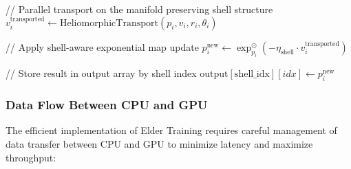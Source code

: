 \begin{algorithm}
\begin{algorithmic}[1]
        \State // Parallel transport on the manifold preserving shell structure
        \State $v_i^{\text{transported}} \gets \text{HeliomorphicTransport}(p_i, v_i, r_i, \theta_i)$
        
        \State // Apply shell-aware exponential map update
        \State $p_i^{\text{new}} \gets \exp_{p_i}^{\odot}(-\eta_{\text{shell}} \cdot v_i^{\text{transported}})$
        
        \State // Store result in output array by shell index
        \State $\text{output}[\text{shell\_idx}][idx] \gets p_i^{\text{new}}$
    \EndIf
\EndFunction
\end{algorithmic}
\end{algorithm}

\subsubsection{Data Flow Between CPU and GPU}

The efficient implementation of Elder Training requires careful management of data transfer between CPU and GPU to minimize latency and maximize throughput:

